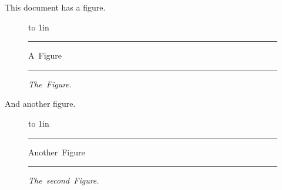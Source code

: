 \documentclass[10pt]{article}
\begin{document}

\ifhint
\def\bfig{\topinsert}
\def\efig{\endinsert}
\def\caption#1{\hbox{\it #1}}
\else
\def\bfig{\begin{figure}[t]}
\def\efig{\end{figure}}
\fi

This document has a figure.

\bfig
  \vbox to 1in {\hrule
    \vfill
    \hbox{A Figure}
    \vfill
    \hrule}
  \caption{The Figure.}
\efig

And another figure.

\bfig
  \vbox to 1in {\hrule
    \vfill
    \hbox{Another Figure}
    \vfill
    \hrule}
  \caption{The second Figure.}
\efig

\vfill
\end{document}
